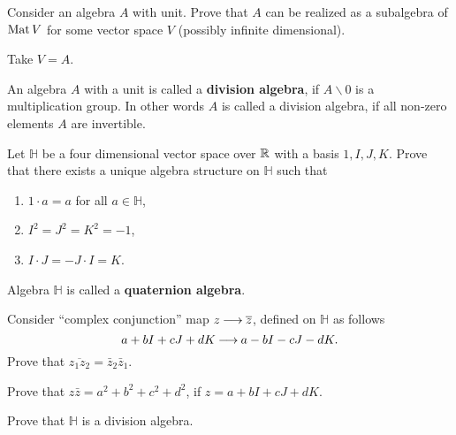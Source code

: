 \documentclass[12pt]{article}
\begin{document}
\begin{zadacha}[!]
Consider an algebra $A$ with unit. Prove that $A$ can be realized as a
subalgebra of $\operatorname{Mat} V$ for some vector space $V$ (possibly infinite
dimensional).
\end{zadacha}

\begin{ukazanie}
Take $V=A$.
\end{ukazanie}

\begin{opredelenie} 
An algebra $A$ with a unit is called  a {\bf division algebra}, if 
$A\backslash 0$ is a multiplication group. In other words $A$
is called a division algebra, if all non-zero elements $A$ are
invertible. 
\end{opredelenie}

\begin{zadacha}\label{quat}
Let $\mathbb H$ be a four dimensional vector space over ${\mathbb R}$ with a
basis $1, I, J, K$. Prove that there exists a unique algebra structure
on $\mathbb H$  such that
\begin{enumerate}
\renewcommand{\labelenumi}{\arabic{enumi}.}
\item $1\cdot a=a$ for all $a\in \mathbb H$,

\item $I^2=J^2=K^2=-1$,

\item $I \cdot J = - J\cdot I =K$.
\end{enumerate}
\end{zadacha}

\begin{opredelenie}
Algebra ${\mathbb H}$ is called a {\bf quaternion algebra}.
\end{opredelenie}

\begin{zadacha}[!] 
Consider ``complex conjunction'' map $z{\:\longrightarrow\:} \overline z$,
defined on ${\mathbb H}$ as follows
\[ 
a + b I + c J + d K {\:\longrightarrow\:} a - b I - c J - d K.
\]
Prove that $\overline{z_1 z_2} = \bar z_2 \bar z_1$.
\end{zadacha}

\begin{zadacha} 
Prove that $z \bar z= a^2 + b^2 + c^2 + d^2$, if $z=a + b I + c
J + d K$.
\end{zadacha}

\begin{zadacha}[!] 
Prove that $\mathbb H$ is a division algebra.
\end{zadacha}
\end{document}
